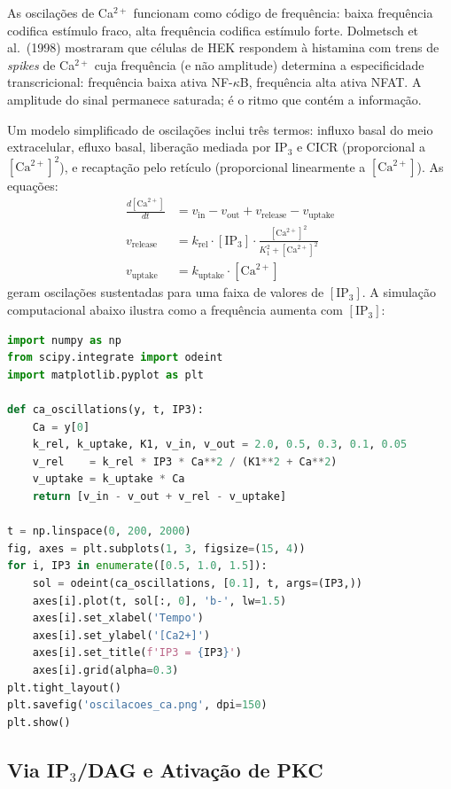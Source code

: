 As oscilações de Ca$^{2+}$ funcionam como código de frequência: baixa frequência
codifica estímulo fraco, alta frequência codifica estímulo forte. Dolmetsch
et al.\ (1998) mostraram que células de HEK respondem à histamina com trens de
\emph{spikes} de Ca$^{2+}$ cuja frequência (e não amplitude) determina a
especificidade transcricional: frequência baixa ativa NF-$\kappa$B,
frequência alta ativa NFAT. A amplitude do sinal permanece saturada; é o
ritmo que contém a informação.

Um modelo simplificado de oscilações inclui três termos: influxo basal do
meio extracelular, efluxo basal, liberação mediada por IP$_3$ e CICR
(proporcional a $[\mathrm{Ca}^{2+}]^2$), e recaptação pelo retículo (proporcional
linearmente a $[\mathrm{Ca}^{2+}]$). As equações:
\begin{align}
\frac{d[\mathrm{Ca}^{2+}]}{dt} &= v_{\mathrm{in}} - v_{\mathrm{out}}
+ v_{\mathrm{release}} - v_{\mathrm{uptake}} \\
v_{\mathrm{release}} &= k_{\mathrm{rel}} \cdot [\mathrm{IP}_3] \cdot
\frac{[\mathrm{Ca}^{2+}]^2}{K_1^2 + [\mathrm{Ca}^{2+}]^2} \\
v_{\mathrm{uptake}} &= k_{\mathrm{uptake}} \cdot [\mathrm{Ca}^{2+}]
\end{align}
geram oscilações sustentadas para uma faixa de valores de $[\mathrm{IP}_3]$.
A simulação computacional abaixo ilustra como a frequência aumenta com
$[\mathrm{IP}_3]$:

\begin{lstlisting}[language=Python, caption=Oscilacoes de Ca2+ via CICR]
import numpy as np
from scipy.integrate import odeint
import matplotlib.pyplot as plt

def ca_oscillations(y, t, IP3):
    Ca = y[0]
    k_rel, k_uptake, K1, v_in, v_out = 2.0, 0.5, 0.3, 0.1, 0.05
    v_rel    = k_rel * IP3 * Ca**2 / (K1**2 + Ca**2)
    v_uptake = k_uptake * Ca
    return [v_in - v_out + v_rel - v_uptake]

t = np.linspace(0, 200, 2000)
fig, axes = plt.subplots(1, 3, figsize=(15, 4))
for i, IP3 in enumerate([0.5, 1.0, 1.5]):
    sol = odeint(ca_oscillations, [0.1], t, args=(IP3,))
    axes[i].plot(t, sol[:, 0], 'b-', lw=1.5)
    axes[i].set_xlabel('Tempo')
    axes[i].set_ylabel('[Ca2+]')
    axes[i].set_title(f'IP3 = {IP3}')
    axes[i].grid(alpha=0.3)
plt.tight_layout()
plt.savefig('oscilacoes_ca.png', dpi=150)
plt.show()
\end{lstlisting}

\subsection{Via IP$_3$/DAG e Ativação de PKC}
\label{subfigure:09-ip3-dag}

